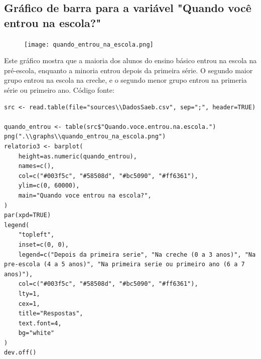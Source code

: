 \documentclass[17pt]{extarticle}
\begin{document}
\newpage
\subsection{Gráfico de barra para a variável "Quando você entrou na escola?"}
\begin{figure}[H]
    \texttt{[image: quando\_entrou\_na\_escola.png]}
    \centering
\end{figure}
Este gráfico mostra que a maioria dos alunos do ensino básico entrou na escola na pré-escola, enquanto a minoria entrou depois da primeira série. O segundo maior grupo entrou na escola na creche, e o segundo menor grupo entrou na primeria série ou primeiro ano. \newline
Código fonte: \newline
\begin{lstlisting}
src <- read.table(file="sources\\DadosSaeb.csv", sep=";", header=TRUE)

quando_entrou <- table(src$"Quando.voce.entrou.na.escola.")
png(".\\graphs\\quando_entrou_na_escola.png")
relatorio3 <- barplot(
    height=as.numeric(quando_entrou),
    names=c(),
    col=c("#003f5c", "#58508d", "#bc5090", "#ff6361"),
    ylim=c(0, 60000),
    main="Quando voce entrou na escola?",
)
par(xpd=TRUE)
legend(
    "topleft",
    inset=c(0, 0),
    legend=c("Depois da primeira serie", "Na creche (0 a 3 anos)", "Na pre-escola (4 a 5 anos)", "Na primeira serie ou primeiro ano (6 a 7 anos)"),
    col=c("#003f5c", "#58508d", "#bc5090", "#ff6361"),
    lty=1,
    cex=1,
    title="Respostas",
    text.font=4,
    bg="white"
)
dev.off()
\end{lstlisting}

\newpage
\end{document}
